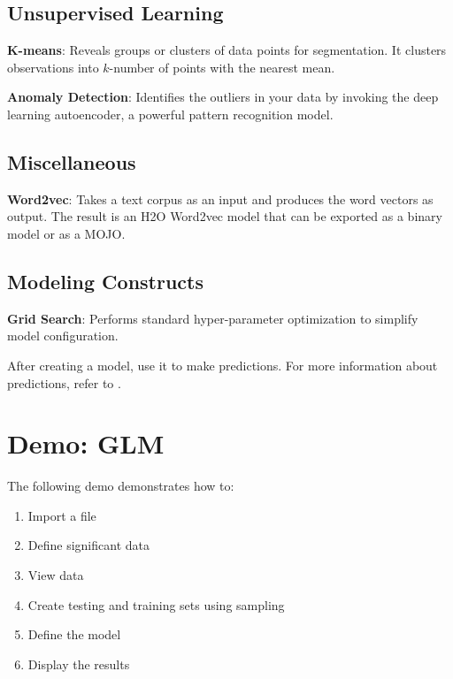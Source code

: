 {{\subsection{Unsupervised Learning}

{\textbf{K-means}}: Reveals groups or clusters of data points for segmentation. It clusters observations into $k$-number of points with the nearest mean.

{\textbf{Anomaly Detection}}: Identifies the outliers in your data by invoking the deep learning autoencoder, a powerful pattern recognition model.

\subsection{Miscellaneous}
{\textbf{Word2vec}}: Takes a text corpus as an input and produces the word vectors as output. The result is an H2O Word2vec model that can be exported as a binary model or as a MOJO.


\subsection{Modeling Constructs}

{\textbf{Grid Search}}: Performs standard hyper-parameter optimization to simplify model configuration.

After creating a model, use it to make predictions. For more information about predictions, refer to {\textbf{}}.


\section{Demo: GLM}

The following demo demonstrates how to:

\begin{enumerate}
\item  Import a file
\item Define significant data
\item View data
\item Create testing and training sets using sampling
\item Define the model
\item Display the results
\end{enumerate}

}}
